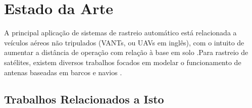 \chapter{Estado da Arte}\label{cap:estArte}

A principal aplicação de sistemas de rastreio automático está relacionada a veículos aéreos não tripulados (VANTs, ou UAVs em inglês), com o intuito de aumentar a distância de operação com relação à base em solo \cite{nugroho2018} \cite{kim2023}.Para rastreio de satélites, existem diversos trabalhos focados em modelar o funcionamento de antenas baseadas em barcos e navios \cite{wang2016} \cite{ueba2016} \cite{gholamiomali2024}. 

\section{Trabalhos Relacionados a Isto}\label{sec:primTrab}

\lipsum[34-36]